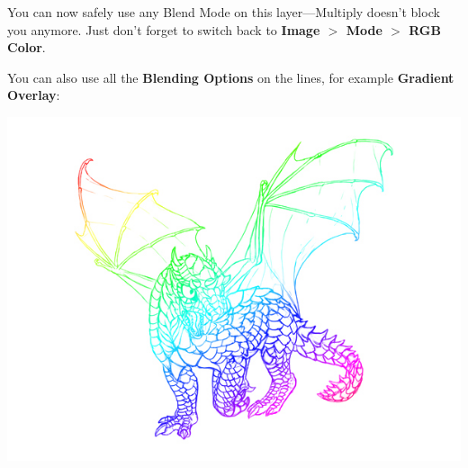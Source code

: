 You can now safely use any Blend Mode on this layer—Multiply doesn't block you anymore. Just don't forget to switch back to \textbf{Image $ > $ Mode $ > $ RGB Color}.

You can also use all the \textbf{Blending Options} on the lines, for example \textbf{Gradient Overlay}:

\begin{center}
\includegraphics[width=0.7\linewidth]{Photos/quick-lineart-done}
\end{center}